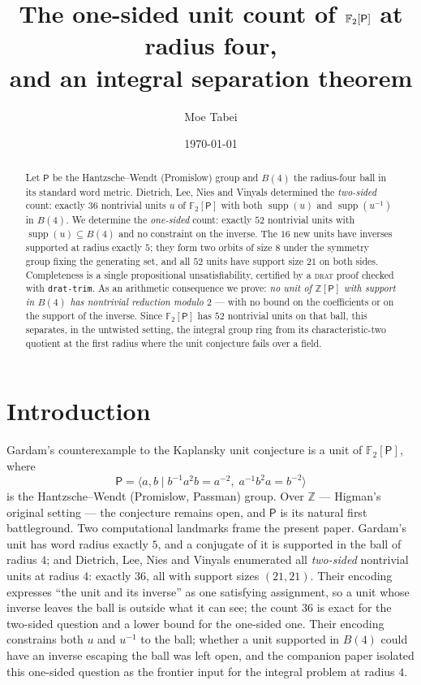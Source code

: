 \documentclass[11pt]{amsart}
\title[One-sided units at radius four]{The one-sided unit count
of $\F_2[\P]$ at radius four,\\ and an integral separation theorem}
\author{Moe Tabei}
\date{\today}
\theoremstyle{definition}
\newcommand{\F}{\mathbb{F}}
\newcommand{\Z}{\mathbb{Z}}
\renewcommand{\P}{\mathsf{P}}
\newcommand{\Ball}[1]{B(#1)}
\newcommand{\supp}{\operatorname{supp}}
\begin{document}
\begin{abstract}
Let $\P$ be the Hantzsche--Wendt (Promislow) group and $\Ball4$ the radius-four
ball in its standard word metric. Dietrich, Lee, Nies and Vinyals determined the
\emph{two-sided} count: exactly $36$ nontrivial units $u$ of $\F_2[\P]$ with
both $\supp(u)$ and $\supp(u^{-1})$ in $\Ball4$. We determine the
\emph{one-sided} count: exactly $52$ nontrivial units with $\supp(u)\subseteq
\Ball4$ and no constraint on the inverse. The $16$ new units have inverses
supported at radius exactly $5$; they form two orbits of size $8$ under the
symmetry group fixing the generating set, and all $52$ units have support size
$21$ on both sides. Completeness is a single propositional unsatisfiability,
certified by a \textsc{drat} proof checked with \texttt{drat-trim}. As an
arithmetic consequence we prove: \emph{no unit of $\Z[\P]$ with support in
$\Ball4$ has nontrivial reduction modulo $2$} --- with no bound on the
coefficients or on the support of the inverse. Since $\F_2[\P]$ has $52$
nontrivial units on that ball, this separates, in the untwisted setting, the
integral group ring from its
characteristic-two quotient at the first radius where the unit conjecture fails
over a field.
\end{abstract}

\maketitle

\section{Introduction}

Gardam's counterexample to the Kaplansky unit conjecture \cite{Gardam2021} is a
unit of $\F_2[\P]$, where
\[
  \P=\langle a,b \mid b^{-1}a^2b=a^{-2},\; a^{-1}b^2a=b^{-2}\rangle
\]
is the Hantzsche--Wendt (Promislow, Passman) group. Over $\Z$ --- Higman's
original setting \cite{Higman1940} --- the conjecture remains open, and $\P$ is
its natural first battleground. Two computational landmarks frame the present
paper. Gardam's unit has word radius exactly $5$, and a conjugate of it is supported
in the ball of radius $4$; and Dietrich, Lee, Nies and Vinyals
\cite{DLNV2026} enumerated all \emph{two-sided} nontrivial units at radius $4$:
exactly $36$, all with support sizes $(21,21)$. Their encoding expresses ``the
unit and its inverse'' as one satisfying assignment, so a unit whose inverse
leaves the ball is outside what it can see; the count $36$ is exact for the
two-sided question and a lower bound for the one-sided one. Their encoding constrains both
$u$ and $u^{-1}$ to the ball; whether a unit supported in $\Ball4$ could have an
inverse escaping the ball was left open, and the companion paper
\cite{Tabei4} isolated this one-sided question as the frontier input for the
integral problem at radius $4$.
\end{document}
